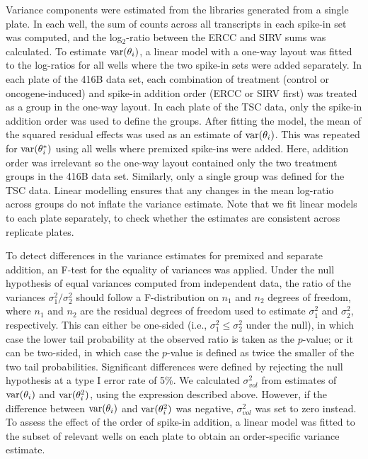 \documentclass{article}
\begin{document}
Variance components were estimated from the libraries generated from a single plate.
In each well, the sum of counts across all transcripts in each spike-in set was computed, and the log$_2$-ratio between the ERCC and SIRV sums was calculated.
To estimate $\mbox{var}(\theta_i)$, a linear model with a one-way layout was fitted to the log-ratios for all wells where the two spike-in sets were added separately.
In each plate of the 416B data set, each combination of treatment (control or oncogene-induced) and spike-in addition order (ERCC or SIRV first) was treated as a group in the one-way layout.
In each plate of the TSC data, only the spike-in addition order was used to define the groups.
After fitting the model, the mean of the squared residual effects was used as an estimate of $\mbox{var}(\theta_i)$.
This was repeated for $\mbox{var}(\theta^*_i)$ using all wells where premixed spike-ins were added.
Here, addition order was irrelevant so the one-way layout contained only the two treatment groups in the 416B data set.
Similarly, only a single group was defined for the TSC data.
Linear modelling ensures that any changes in the mean log-ratio across groups do not inflate the variance estimate.
Note that we fit linear models to each plate separately, to check whether the estimates are consistent across replicate plates.

To detect differences in the variance estimates for premixed and separate addition, an F-test for the equality of variances was applied.
Under the null hypothesis of equal variances computed from independent data, the ratio of the variances $\sigma^2_1/\sigma^2_2$ should follow a F-distribution on $n_1$ and $n_2$ degrees of freedom, where $n_1$ and $n_2$ are the residual degrees of freedom used to estimate $\sigma^2_1$ and $\sigma^2_2$, respectively.
This can either be one-sided (i.e., $\sigma^2_1 \le \sigma^2_2$ under the null), in which case the lower tail probability at the observed ratio is taken as the $p$-value;
or it can be two-sided, in which case the $p$-value is defined as twice the smaller of the two tail probabilities.
Significant differences were defined by rejecting the null hypothesis at a type I error rate of 5\%.
We calculated $\sigma^2_{vol}$ from estimates of $\mbox{var}(\theta_i)$ and $\mbox{var}(\theta^2_i)$, using the expression described above.
However, if the difference between $\mbox{var}(\theta_i)$ and $\mbox{var}(\theta^2_i)$ was negative, $\sigma^2_{vol}$ was set to zero instead.
To assess the effect of the order of spike-in addition, a linear model was fitted to the subset of relevant wells on each plate to obtain an order-specific variance estimate.
\end{document}
